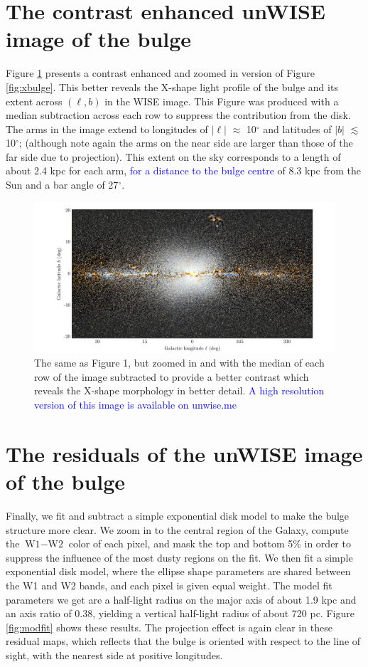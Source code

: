 \documentclass[12pt, preprint]{aastex}
\begin{document}
\section{The contrast enhanced unWISE image of the bulge}

Figure \ref{fig:filt} presents a contrast enhanced and zoomed in version of Figure \ref{fig:xbulge}. This better reveals the X-shape light profile of the bulge and its extent across $(\ell,b)$ in the WISE image. This Figure was produced with a median subtraction across each row to suppress the contribution from the disk. The arms in the image extend to longitudes of $|\ell|$ $\approx$ 10$^\circ$ and latitudes of $|b|$ $\lesssim$ 10$^\circ$; (although note again the arms on the near side are larger than those of the far side due to projection). This extent on the sky corresponds to a length of about 2.4 kpc for each arm, \textcolor{blue}{for a distance to the bulge centre} of 8.3 kpc from the Sun and a bar angle of 27$^\circ$.

\begin{figure}[h!]
\centering
        \includegraphics[width=\textwidth]{xbulge-01}
\caption{The same as Figure 1, but zoomed in and with the median of each row of the image subtracted to provide a better contrast which reveals the X-shape morphology in better detail. \textcolor{blue}{A high resolution version of this image is available on unwise.me}}
\label{fig:filt}
\end{figure}

\section{The residuals of the unWISE image of the bulge}

Finally, we fit and subtract a simple exponential disk model to make the bulge structure more clear.  We zoom in to the central region of the Galaxy, compute the $\textrm{W1} - \textrm{W2}$ color of each pixel, and mask the top and bottom 5\% in order to suppress the influence of the most dusty regions on the fit.  We then fit a simple exponential disk model, where the ellipse shape parameters are shared between the W1 and W2 bands, and each pixel is given equal weight.
The model fit parameters we get are a half-light radius on the major axis of about 1.9 kpc and an axis ratio of 0.38, yielding a vertical half-light radius of about 720 pc.
Figure \ref{fig:modfit} shows these results.
The projection effect is again clear in these residual maps, which reflects that the bulge is oriented with respect to the line of sight, with the nearest side at  positive longitudes. %
\end{document}
